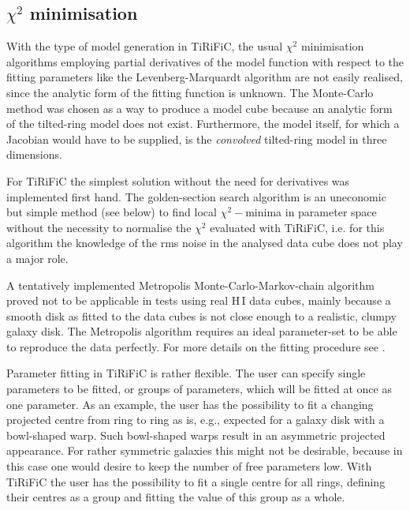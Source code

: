 \documentclass[oldversion]{aa}
\newcommand{\cng}[1]{{#1}}
\begin{document}
\subsection{$\chi^2$ minimisation}
\label{Sect_2.2.4}

With the type of model generation in TiRiFiC, the usual $\chi^2$
minimisation algorithms employing partial derivatives of the model
function with respect to the fitting parameters like the
Levenberg-Marquardt algorithm
\citep[][]{Levenberg44,Marquardt63,Press86} are not easily realised,
since the analytic form of the fitting function is unknown.  The
Monte-Carlo method  \cng{was chosen} as a way to produce a model cube because
an analytic form of the tilted-ring model does not exist.  Furthermore,
the model itself, for which a Jacobian would have to be supplied, is the
\emph{convolved} tilted-ring model in three dimensions. 

For TiRiFiC the simplest solution without the need for derivatives was
implemented first hand.  The golden-section search algorithm \citep[][
Chap.  10.1]{Press86} is an uneconomic but \cng{simple} method (see below)
to find local $\chi^2-$minima in parameter space without the necessity
to normalise the $\chi^2$ evaluated with TiRiFiC, i.e.  for this
algorithm the knowledge of the rms noise in the analysed data cube does
not play a major role. 

A tentatively implemented Metropolis Monte-Carlo-Markov-chain algorithm
\citep[][]{Metropolis53} proved not to be applicable in tests using
real H{\,{\small I}} data cubes, mainly because a smooth
disk as fitted to the data cubes is not close enough to a realistic, clumpy
galaxy disk. The Metropolis algorithm requires an ideal
parameter-set to be able to reproduce the data perfectly. For more
details on the fitting procedure see \citet[][ Chap.~2]{Jozsa06}.

Parameter fitting in TiRiFiC is rather flexible.  The user can specify
single parameters to be fitted, or groups of parameters, which will be
fitted at once as one parameter.  As an example, the user has the
possibility to fit a changing projected centre from ring to ring as is,
e.g., expected for a galaxy disk with a bowl-shaped warp.  Such
bowl-shaped warps result in an asymmetric projected appearance.  For
rather symmetric galaxies this might not be desirable, because in this
case one would desire to keep the number of free parameters low.  With
TiRiFiC the user has the possibility to fit a single centre for all
rings, defining their centres as a group and fitting the value of this
group as a whole. 
\end{document}
